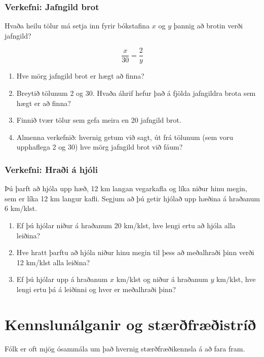 \documentclass[
  icelandic,
]{book}
\providecommand{\tightlist}{%
  \setlength{\itemsep}{0pt}\setlength{\parskip}{0pt}}
\begin{document}
\subsection{Verkefni: Jafngild brot}\label{verkefni-jafngild}

Hvaða heilu tölur má setja inn fyrir bókstafina \(x\) og \(y\) þannig að brotin verði jafngild?

\[
 \dfrac{x}{30} = \dfrac{2}{y} 
\]

\begin{enumerate}
\def\labelenumi{\alph{enumi}.}
\tightlist
\item
  Hve mörg jafngild brot er hægt að finna?
\item
  Breytið tölunum 2 og 30. Hvaða áhrif hefur það á fjölda jafngildra brota sem hægt er að finna?
\item
  Finnið tvær tölur sem gefa meira en 20 jafngild brot.
\item
  Almenna verkefnið: hvernig getum við sagt, út frá tölunum (sem voru upphaflega 2 og 30) hve mörg jafngild brot við fáum?
\end{enumerate}

\subsection{Verkefni: Hraði á hjóli}\label{verkefni-hradi-hjol}

Þú þarft að hjóla upp hæð, 12 km langan vegarkafla og líka niður hinu megin, sem er líka 12 km langur kafli. Segjum að þú getir hjólað upp hæðina á hraðanum 6 km/klst.

\begin{enumerate}
\def\labelenumi{\alph{enumi}.}
\tightlist
\item
  Ef þú hjólar niður á hraðanum 20 km/klst, hve lengi ertu að hjóla alla leiðina?
\item
  Hve hratt þarftu að hjóla niður hinu megin til þess að meðalhraði þinn verði 12 km/klst alla leiðina?
\item
  Ef þú hjólar upp á hraðanum \(x\) km/klst og niður á hraðanum \(y\) km/klst, hve lengi ertu þá á leiðinni og hver er meðalhraði þinn?
\end{enumerate}

\chapter{Kennslunálganir og stærðfræðistríð}\label{nalgangir-strid}

Fólk er oft mjög ósammála um það hvernig stærðfræðikennsla á að fara fram.
\end{document}
